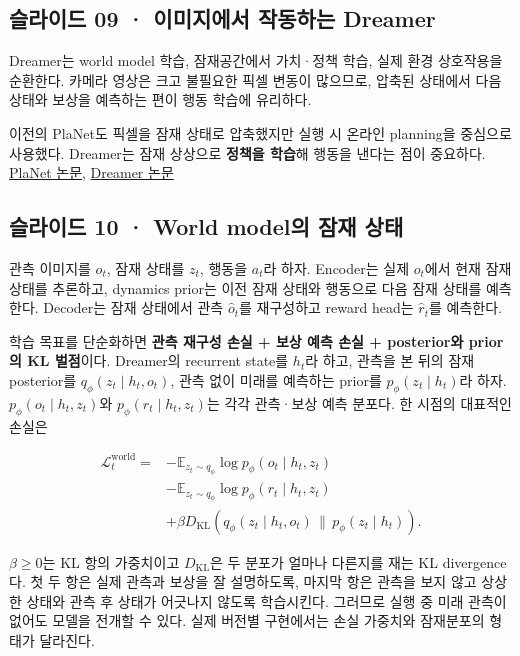 \documentclass[11pt,a4paper]{article}
\begin{document}
\subsection{슬라이드 09 · 이미지에서 작동하는 Dreamer}

Dreamer는 world model 학습, 잠재공간에서 가치·정책 학습, 실제 환경 상호작용을 순환한다. 카메라 영상은 크고 불필요한 픽셀 변동이 많으므로, 압축된 상태에서 다음 상태와 보상을 예측하는 편이 행동 학습에 유리하다.\par

이전의 PlaNet도 픽셀을 잠재 상태로 압축했지만 실행 시 온라인 planning을 중심으로 사용했다. Dreamer는 잠재 상상으로 \textbf{정책을 학습}해 행동을 낸다는 점이 중요하다. \href{https://proceedings.mlr.press/v97/hafner19a.html}{PlaNet 논문}, \href{https://arxiv.org/abs/1912.01603}{Dreamer 논문}\par

\subsection{슬라이드 10 · World model의 잠재 상태}

관측 이미지를 $o_t$, 잠재 상태를 $z_t$, 행동을 $a_t$라 하자. Encoder는 실제 $o_t$에서 현재 잠재 상태를 추론하고, dynamics prior는 이전 잠재 상태와 행동으로 다음 잠재 상태를 예측한다. Decoder는 잠재 상태에서 관측 $\hat o_t$를 재구성하고 reward head는 $\hat r_t$를 예측한다.\par

학습 목표를 단순화하면 \textbf{관측 재구성 손실 + 보상 예측 손실 + posterior와 prior의 KL 벌점}이다. Dreamer의 recurrent state를 $h_t$라 하고, 관측을 본 뒤의 잠재 posterior를 $q_\phi(z_t\mid h_t,o_t)$, 관측 없이 미래를 예측하는 prior를 $p_\phi(z_t\mid h_t)$라 하자. $p_\phi(o_t\mid h_t,z_t)$와 $p_\phi(r_t\mid h_t,z_t)$는 각각 관측·보상 예측 분포다. 한 시점의 대표적인 손실은\par

\[
\begin{aligned}
\mathcal L_t^{\mathrm{world}}={}&-\mathbb E_{z_t\sim q_\phi}\log p_\phi(o_t\mid h_t,z_t)\\
&-\mathbb E_{z_t\sim q_\phi}\log p_\phi(r_t\mid h_t,z_t)\\
&+\beta D_{\mathrm{KL}}\!\left(q_\phi(z_t\mid h_t,o_t)\,\|\,p_\phi(z_t\mid h_t)\right).
\end{aligned}
\]

$\beta\ge0$는 KL 항의 가중치이고 $D_{\mathrm{KL}}$은 두 분포가 얼마나 다른지를 재는 KL divergence다. 첫 두 항은 실제 관측과 보상을 잘 설명하도록, 마지막 항은 관측을 보지 않고 상상한 상태와 관측 후 상태가 어긋나지 않도록 학습시킨다. 그러므로 실행 중 미래 관측이 없어도 모델을 전개할 수 있다. 실제 버전별 구현에서는 손실 가중치와 잠재분포의 형태가 달라진다.\par
\end{document}
